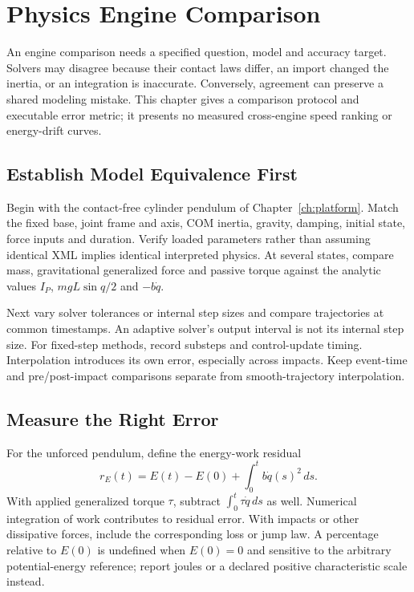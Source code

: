 \chapter{Physics Engine Comparison}
\label{ch:engine-comparison}

An engine comparison needs a specified question, model and accuracy target.
Solvers may disagree because their contact laws differ, an import changed the
inertia, or an integration is inaccurate. Conversely, agreement can preserve a
shared modeling mistake. This chapter gives a comparison protocol and executable
error metric; it presents no measured cross-engine speed ranking or energy-drift
curves.

\section{Establish Model Equivalence First}

Begin with the contact-free cylinder pendulum of Chapter~\ref{ch:platform}.
Match the fixed base, joint frame and axis, COM inertia, gravity, damping,
initial state, force inputs and duration. Verify loaded parameters rather than
assuming identical XML implies identical interpreted physics. At several states,
compare mass, gravitational generalized force and passive torque against the
analytic values $I_P$, $mgL\sin q/2$ and $-b\dot q$.

Next vary solver tolerances or internal step sizes and compare trajectories at
common timestamps. An adaptive solver's output interval is not its internal
step size. For fixed-step methods, record substeps and control-update timing.
Interpolation introduces its own error, especially across impacts. Keep
event-time and pre/post-impact comparisons separate from smooth-trajectory
interpolation.

\section{Measure the Right Error}

For the unforced pendulum, define the energy-work residual
\begin{equation}
 r_E(t)=E(t)-E(0)+\int_0^t b\dot q(s)^2\,ds.
\end{equation}
With applied generalized torque $\tau$, subtract
$\int_0^t\tau\dot q\,ds$ as well. Numerical integration of work contributes
to residual error. With impacts or other dissipative forces, include the
corresponding loss or jump law. A percentage relative to $E(0)$ is undefined
when $E(0)=0$ and sensitive to the arbitrary potential-energy reference; report
joules or a declared positive characteristic scale instead.

